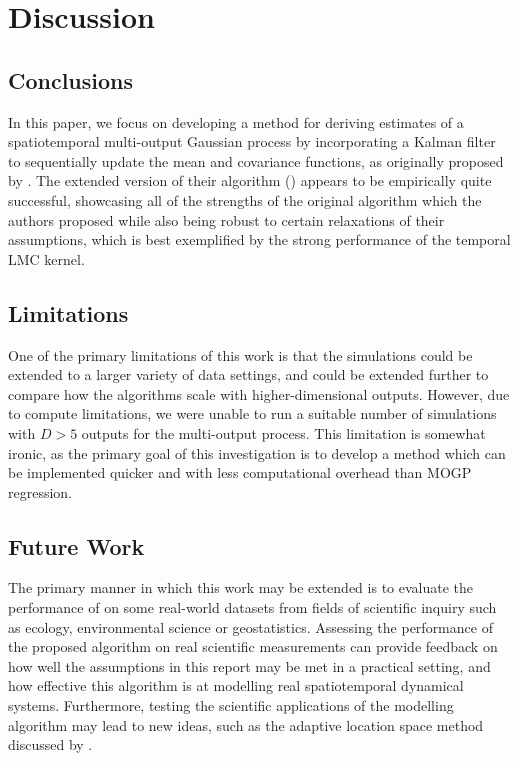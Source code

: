 \documentclass[10pt]{article}
\numberwithin{equation}{section}
\begin{document}
\section{Discussion}
\label{sec:discussion}

\subsection{Conclusions}

In this paper, we focus on developing a method for deriving estimates of a spatiotemporal multi-output Gaussian process by incorporating a Kalman filter to sequentially update the mean and covariance functions, as originally proposed by \citeauthor{Todescato-Efficient-2020}. The extended version of their algorithm () appears to be empirically quite successful, showcasing all of the strengths of the original algorithm which the authors proposed while also being robust to certain relaxations of their assumptions, which is best exemplified by the strong performance of the temporal LMC kernel.


\subsection{Limitations}
One of the primary limitations of this work is that the simulations could be extended to a larger variety of data settings, and could be extended further to compare how the algorithms scale with higher-dimensional outputs. However, due to compute limitations, we were unable to run a suitable number of simulations with $D > 5$ outputs for the multi-output process. This limitation is somewhat ironic, as the primary goal of this investigation is to develop a method which can be implemented quicker and with less computational overhead than MOGP regression. 

\subsection{Future Work}
The primary manner in which this work may be extended is to evaluate the performance of  on some real-world datasets from fields of scientific inquiry such as ecology, environmental science or geostatistics. Assessing the performance of the proposed algorithm on real scientific measurements can provide feedback on how well the assumptions in this report may be met in a practical setting, and how effective this algorithm is at modelling real spatiotemporal dynamical systems. Furthermore, testing the scientific applications of the modelling algorithm may lead to new ideas, such as the adaptive location space method discussed by \citeauthor{Todescato-Efficient-2020}.
\end{document}
